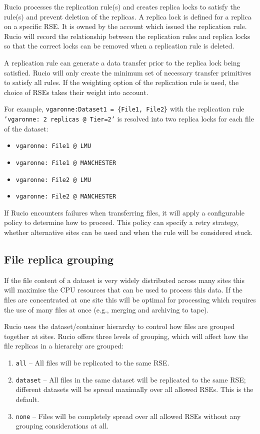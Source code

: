 \documentclass{atlasnote}
\begin{document}
Rucio processes the replication rule(s) and creates replica locks to satisfy the rule(s) and prevent deletion of the replicas. A replica lock is defined for a replica on a specific RSE. It is owned by the account which issued the replication rule. Rucio will record the relationship between the replication rules and replica locks so that the correct locks can be removed when a replication rule is deleted.

A replication rule can generate a data transfer prior to the replica lock being satisfied. Rucio will only create the minimum set of necessary transfer primitives to satisfy all rules. If the weighting option of the replication rule is used, the choice of RSEs takes their weight into account.

For example, \texttt{vgaronne:Dataset1 = \{File1, File2\}} with the replication rule \texttt{'vgaronne: 2 replicas @ Tier=2'} is resolved into two replica locks for each file of the dataset:

\begin{itemize}
\item[] \texttt{vgaronne: File1 @ LMU}
\item[] \texttt{vgaronne: File1 @ MANCHESTER}
\item[] \texttt{vgaronne: File2 @ LMU}
\item[] \texttt{vgaronne: File2 @ MANCHESTER}
\end{itemize}

If Rucio encounters failures when transferring files, it will apply a configurable policy to determine how to proceed. This policy can specify a retry strategy, whether alternative sites can be used and when the rule will be considered stuck.

\subsection{File replica grouping}
\label{sec:file-replica-grouping}

If the file content of a dataset is very widely distributed across many sites this will maximise the CPU resources that can be used to process this data. If the files are concentrated at one site this will be optimal for processing which requires the use of many files at once (e.g., merging and archiving to tape).

Rucio uses the dataset/container hierarchy to control how files are grouped together at sites. Rucio offers three levels of grouping, which will affect how the file replicas in a hierarchy are grouped:
\begin{enumerate}
\item[] \texttt{all} -- All files will be replicated to the same RSE.
\item[] \texttt{dataset} -- All files in the same dataset will be replicated to the same RSE; different datasets will be spread maximally over all allowed RSEs. This is the default.
\item[] \texttt{none} -- Files will be completely spread over all allowed RSEs without any grouping considerations at all.
\end{enumerate}
\end{document}
